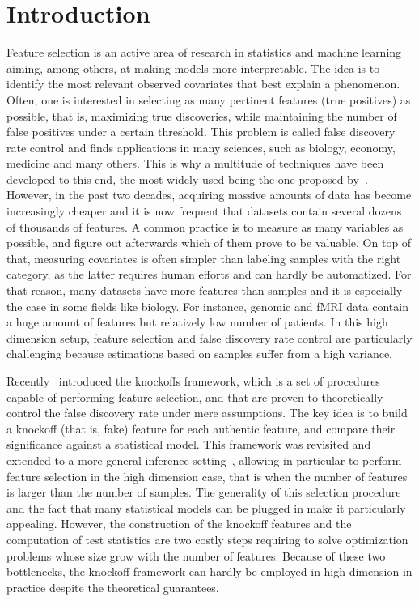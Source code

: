 \cleardoublepage
\chapter*{Introduction}

Feature selection is an active area of research in statistics and machine learning
aiming, among others, at making models more interpretable.
The idea is to identify the most relevant observed covariates that best explain a phenomenon.
Often, one is interested in selecting as many pertinent features (true positives) as possible,
that is, maximizing true discoveries,
while maintaining the number of false positives under a certain threshold.
This problem is called false discovery rate control and finds applications in many sciences,
such as biology, economy, medicine and many others.
This is why a multitude of techniques have been developed to this end,
the most widely used being the one proposed by~\cite{bh}.
However, in the past two decades, acquiring massive amounts of data has become increasingly cheaper
and it is now frequent that datasets contain several dozens of thousands of features.
A common practice is to measure as many variables as possible,
and figure out afterwards which of them prove to be valuable.
On top of that, measuring covariates is often simpler than labeling samples with the right category,
as the latter requires human efforts and can hardly be automatized.
For that reason, many datasets have more features than samples
and it is especially the case in some fields like biology.
\cite{statistical_inference_genome}
For instance, genomic and fMRI data contain a huge amount of features but relatively low number of patients.
In this high dimension setup, feature selection and false discovery rate control are particularly challenging
because estimations based on samples suffer from a high variance.

Recently~\citet{fixed_x_knockoffs} introduced the knockoffs framework,
which is a set of procedures capable of performing feature selection,
and that are proven to theoretically control the false discovery rate under mere assumptions.
The key idea is to build a knockoff (that is, fake) feature for each authentic feature,
and compare their significance against a statistical model.
This framework was revisited and extended to a more general inference setting~\citep{model_x_knockoffs},
allowing in particular to perform feature selection in the high dimension case,
that is when the number of features is larger than the number of samples.
The generality of this selection procedure
and the fact that many statistical models can be plugged in make it particularly appealing.
However, the construction of the knockoff features and the computation of test statistics
are two costly steps requiring to solve optimization problems whose size grow with the number of features.
Because of these two bottlenecks,
the knockoff framework can hardly be employed in high dimension in practice despite the theoretical guarantees.

